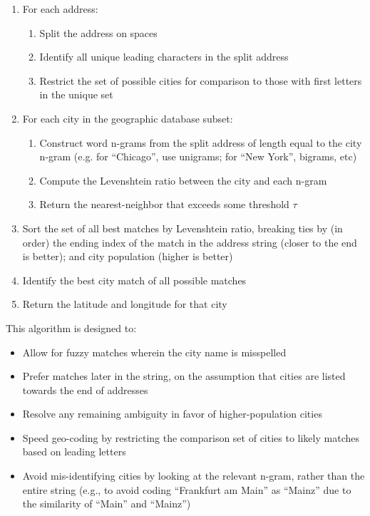\documentclass[11pt]{article}
\begin{document}
\begin{enumerate}
\item For each address:
  \begin{enumerate}
  \item Split the address on spaces
  \item Identify all unique leading characters in the split address
  \item Restrict the set of possible cities for comparison to those
    with first letters in the unique set
  \end{enumerate}
\item For each city in the geographic database subset:
  \begin{enumerate}
  \item Construct word n-grams from the split address of length equal to
    the city n-gram (e.g. for ``Chicago'', use unigrams; for ``New
    York'', bigrams, etc)
  \item Compute the Levenshtein ratio between the city and each n-gram
  \item Return the nearest-neighbor that exceeds some threshold $\tau$
  \end{enumerate}
\item Sort the set of all best matches by Levenshtein ratio, breaking
  ties by (in order) the ending index of the match in the address
  string (closer to the end is better); and city population (higher is
  better)
\item Identify the best city match of all possible matches
\item Return the latitude and longitude for that city
\end{enumerate}

This algorithm is designed to:
\begin{itemize}
\item Allow for fuzzy matches wherein the city name is misspelled
\item Prefer matches later in the string, on the assumption that
  cities are listed towards the end of addresses
\item Resolve any remaining ambiguity in favor of higher-population cities
\item Speed geo-coding by restricting the comparison set of cities to
  likely matches based on leading letters
\item Avoid mis-identifying cities by looking at the relevant n-gram,
  rather than the entire string (e.g., to avoid coding ``Frankfurt am
  Main'' as ``Mainz'' due to the similarity of ``Main'' and ``Mainz'')
\end{itemize}
\end{document}
